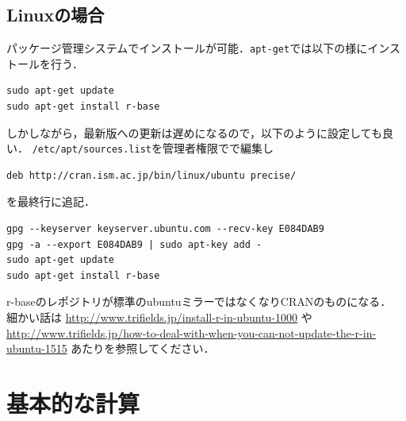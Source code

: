 \documentclass[a4paper,10pt,fleqn]{jarticle}
\begin{document}
\subsection{Linuxの場合}
パッケージ管理システムでインストールが可能．\verb+apt-get+では以下の様にインストールを行う．
\begin{breakbox}
\begin{verbatim}
sudo apt-get update
sudo apt-get install r-base
\end{verbatim}
\end{breakbox}
しかしながら，最新版への更新は遅めになるので，以下のように設定しても良い．
\verb+/etc/apt/sources.list+を管理者権限でで編集し
\begin{breakbox}
\begin{verbatim}
deb http://cran.ism.ac.jp/bin/linux/ubuntu precise/
\end{verbatim}
\end{breakbox}
を最終行に追記．
\begin{breakbox}
\begin{verbatim}
gpg --keyserver keyserver.ubuntu.com --recv-key E084DAB9
gpg -a --export E084DAB9 | sudo apt-key add -
sudo apt-get update
sudo apt-get install r-base
\end{verbatim}
\end{breakbox}
r-baseのレポジトリが標準のubuntuミラーではなくなりCRANのものになる．\\
細かい話は \url{http://www.trifields.jp/install-r-in-ubuntu-1000} や\\ \url{http://www.trifields.jp/how-to-deal-with-when-you-can-not-update-the-r-in-ubuntu-1515} あたりを参照してください．
\newpage
\section{基本的な計算}
\end{document}
